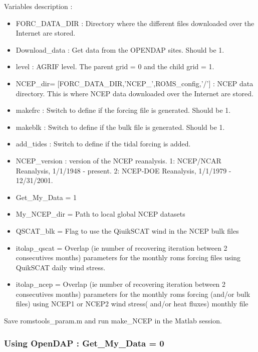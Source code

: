 Variables description :
\begin{itemize}
\item FORC\_DATA\_DIR : Directory where the different files downloaded over 
the Internet are stored.
\item Download\_data : Get data from the OPENDAP sites. Should be 1.
\item level : AGRIF level. The parent grid = 0 and the child grid = 1.
\item NCEP\_dir= [FORC\_DATA\_DIR,'NCEP\_',ROMS\_config,'/'] : NCEP data directory. 
This is where NCEP data downloaded over the Internet are stored.
\item makefrc : Switch to define if the forcing file is generated. Should be 1.
\item makeblk : Switch to define if the bulk file is generated. Should be 1.
\item add\_tides : Switch to define if the tidal forcing is added. 
\item NCEP\_version : version of the NCEP reanalysis. 1: NCEP/NCAR Reanalysis, 1/1/1948 - present.
2: NCEP-DOE Reanalysis, 1/1/1979 - 12/31/2001.
\item Get\_My\_Data = 1
\item My\_NCEP\_dir = Path to local global NCEP datasets
\item QSCAT\_blk = Flag to use the QiuikSCAT wind in the NCEP bulk files
\item itolap\_qscat = Overlap (ie number of recovering iteration between 2
  consecutives months) parameters for the monthly roms forcing files using QuikSCAT daily wind stress.
\item itolap\_ncep = Overlap (ie number of recovering iteration between 2
  consecutives months) parameters for the monthly roms forcing (and/or bulk files) using NCEP1 or
  NCEP2 wind stress( and/or heat fluxes)  monthly file
\end{itemize}

Save romstools\_param.m and run make\_NCEP in the Matlab session.

\subsubsection{Using OpenDAP : Get\_My\_Data = 0}


